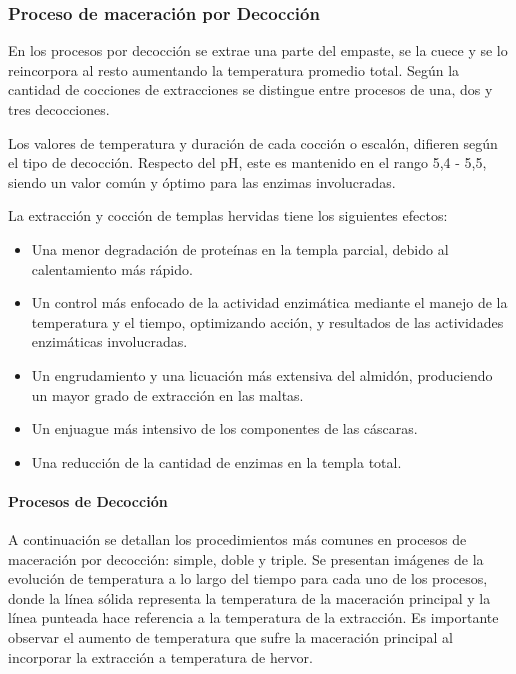             \subsubsection{Proceso de maceración por Decocción}
                \par En los procesos por decocción se extrae una parte del empaste, se la cuece y se lo reincorpora al resto aumentando la temperatura promedio total. Según la cantidad de cocciones de extracciones se distingue entre procesos de una, dos y tres decocciones.
            
                \par Los valores de temperatura y duración de cada cocción o escalón, difieren según el tipo de decocción. Respecto del pH, este es mantenido en el rango 5,4 - 5,5, siendo un valor común y óptimo para las enzimas involucradas.
                
                \par La extracción y cocción de templas hervidas tiene los siguientes efectos:
                
                \begin{itemize}
                    \item Una menor degradación de proteínas en la templa parcial, debido al calentamiento más rápido.
                    
                    \item Un control más enfocado de la actividad enzimática mediante el manejo de la temperatura y el tiempo, optimizando acción, y resultados de las actividades enzimáticas involucradas.
                    
                    \item Un engrudamiento y una licuación más extensiva del almidón, produciendo un mayor grado de extracción en las maltas.
                    
                    \item Un enjuague más intensivo de los componentes de las cáscaras.
                    
                    \item Una reducción de la cantidad de enzimas en la templa total.
                \end{itemize}
                
                \paragraph{Procesos de Decocción} A continuación se detallan los procedimientos más comunes en procesos de maceración por decocción: simple, doble y triple. Se presentan imágenes de la evolución de temperatura a lo largo del tiempo para cada uno de los procesos, donde la línea sólida representa la temperatura de la maceración principal y la línea punteada hace referencia a la temperatura de la extracción. Es importante observar el aumento de temperatura que sufre la maceración principal al incorporar la extracción a temperatura de hervor.
                
